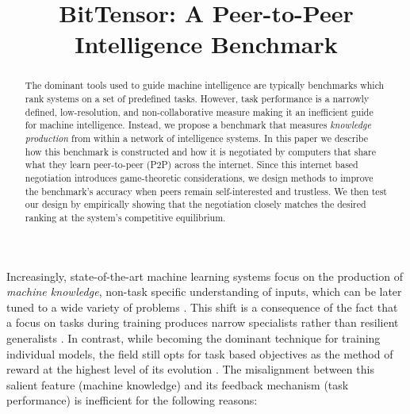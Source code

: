 \documentclass{article}
\title{BitTensor: A Peer-to-Peer Intelligence Benchmark}
\begin{document}
\maketitle

\begin{abstract}
The dominant tools used to guide machine intelligence are typically benchmarks which rank systems on a set of predefined tasks. However, task performance is a narrowly defined, low-resolution, and non-collaborative measure making it an inefficient guide for machine intelligence. Instead, we propose a benchmark that measures \textit{knowledge production} from within a network of intelligence systems. In this paper we describe how this benchmark is constructed and how it is negotiated by computers that share what they learn peer-to-peer (P2P) across the internet. Since this internet based negotiation introduces game-theoretic considerations, we design methods to improve the benchmark's accuracy when peers remain self-interested and trustless. We then test our design by empirically showing that the negotiation closely matches the desired ranking at the system's competitive equilibrium. 

\end{abstract}

Increasingly, state-of-the-art machine learning systems focus on the production of \textit{machine knowledge}, non-task specific understanding of inputs, which can be later tuned to a wide variety of problems \cite{devlin2018bert}. This shift is a consequence of the fact that a focus on tasks during training produces narrow specialists rather than resilient generalists \cite{radford2019language}. In contrast, while becoming the dominant technique for training individual models, the field still opts for task based objectives as the method of reward at the highest level of its evolution \cite{wang2018glue}. The misalignment between this salient feature (machine knowledge) and its feedback mechanism (task performance) is inefficient for the following reasons:
\end{document}
